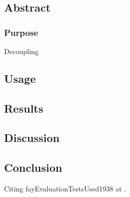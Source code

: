 \chapter[CDD]{}\label{chap:01}


\setcounter{section}{-1}
\section{Abstract}

\subsection{Purpose}
Decoupling 


\section{Usage}

\section{Results}

\section{Discussion}

\section{Conclusion}
Citing fayEvaluationTestsUsed1938 at \cite{fayEvaluationTestsUsed1938}.





\printglossary[type=cdd]
